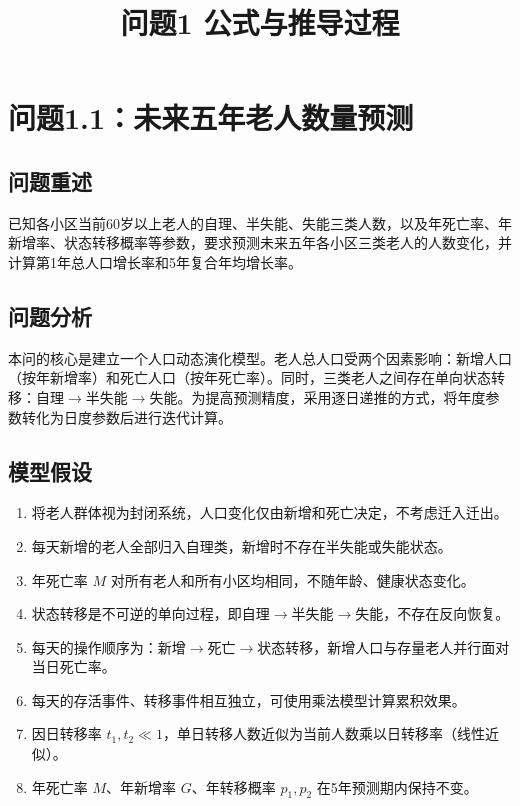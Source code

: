 \documentclass[12pt,a4paper]{article}
\title{问题1 公式与推导过程}
\date{}
\begin{document}
\maketitle

\section{问题1.1：未来五年老人数量预测}

\subsection{问题重述}

已知各小区当前60岁以上老人的自理、半失能、失能三类人数，以及年死亡率、年新增率、状态转移概率等参数，要求预测未来五年各小区三类老人的人数变化，并计算第1年总人口增长率和5年复合年均增长率。

\subsection{问题分析}

本问的核心是建立一个人口动态演化模型。老人总人口受两个因素影响：新增人口（按年新增率）和死亡人口（按年死亡率）。同时，三类老人之间存在单向状态转移：自理$\to$半失能$\to$失能。为提高预测精度，采用逐日递推的方式，将年度参数转化为日度参数后进行迭代计算。

\subsection{模型假设}

\begin{enumerate}
    \item 将老人群体视为封闭系统，人口变化仅由新增和死亡决定，不考虑迁入迁出。
    \item 每天新增的老人全部归入自理类，新增时不存在半失能或失能状态。
    \item 年死亡率 $M$ 对所有老人和所有小区均相同，不随年龄、健康状态变化。
    \item 状态转移是不可逆的单向过程，即自理$\to$半失能$\to$失能，不存在反向恢复。
    \item 每天的操作顺序为：新增$\to$死亡$\to$状态转移，新增人口与存量老人并行面对当日死亡率。
    \item 每天的存活事件、转移事件相互独立，可使用乘法模型计算累积效果。
    \item 因日转移率 $t_1, t_2 \ll 1$，单日转移人数近似为当前人数乘以日转移率（线性近似）。
    \item 年死亡率 $M$、年新增率 $G$、年转移概率 $p_1, p_2$ 在5年预测期内保持不变。
\end{enumerate}
\end{document}
